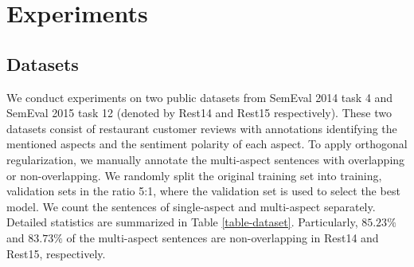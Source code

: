 \documentclass[11pt,a4paper]{article}
\begin{document}
\section{Experiments}
\subsection{Datasets}
We conduct experiments on two public datasets from SemEval 2014 task 4 \cite{Pontiki2014SemEval} and SemEval 2015 task 12 (denoted by Rest14 and Rest15 respectively). These two datasets consist of restaurant customer reviews with annotations identifying the mentioned aspects and the sentiment polarity of each aspect. To apply orthogonal regularization, we manually annotate the multi-aspect sentences with overlapping or non-overlapping. We randomly split the original training set into training, validation sets in the ratio 5:1, where the validation set is used to select the best model. We count the sentences of single-aspect and multi-aspect separately. Detailed statistics are summarized in Table \ref{table-dataset}. Particularly, $85.23\%$ and $83.73\%$ of the multi-aspect sentences are non-overlapping in Rest14 and Rest15, respectively.  

\begin{comment}
\begin{table}[t!]
\begin{center}
\setlength{\tabcolsep}{0.3mm}{
\begin{tabular} {|c|ccc|ccc|}
\hline
	\multirow{2}{*}{Dataset} &  \multicolumn{3}{c|}{\#sentences} & \multicolumn{3}{c|}{\#aspects}  \\
    \cline{2-7}
    & \emph{Single} &  \emph{Multi} &  Total &  \emph{Single} & \emph{Multi} & Total \\
	\hline
		Rest14\_Train & 2053 & 482 & 2535 & 2053 & 1047 & 3100\\
        Rest14\_Val & 412 & 94 & 506 & 412 & 201 & 613 \\
		Rest14\_Test & 611 & 189 & 800 & 611 & 414 & 1025 \\
        \hline
        Rest15\_Train & 622 & 309 & 931 & 622 & 766 & 1388 \\
        Rest15\_Val & 137 & 52 & 189 & 137 & 129 & 266 \\
        Rest15\_Test & 390 & 192 & 582 & 390 & 455 & 845 \\
	\hline
\end{tabular}}
\end{center}
\caption{\label{table-dataset} The numbers of single-aspect and multi-aspect sentences, and the numbers of aspects in single-aspect and multi-aspect sentences.}	
\end{table}
\end{comment}
\end{document}
